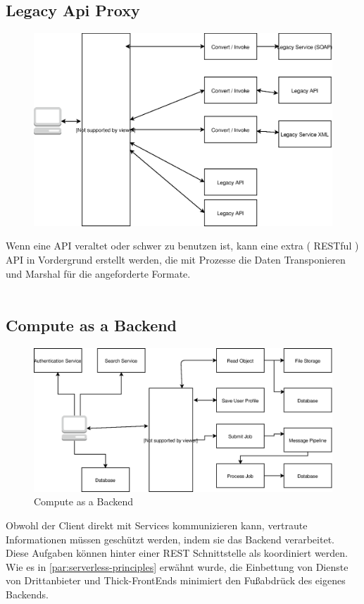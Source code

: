 \documentclass[
12pt,
english,
ngerman,
headsepline,
twoside,
openright,
numbers=noenddot,version=first
]{scrreprt}
\begin{document}
\subsection{Legacy Api Proxy}
\begin{figure}
	\includegraphics[width=0.9\linewidth]{./pics/legacy-api-proxy.eps}
\end{figure}
Wenn eine \acrshort{API} veraltet oder schwer zu benutzen ist, kann eine extra ( RESTful ) \acrshort{API} in Vordergrund erstellt werden, die  mit Prozesse die Daten Transponieren und Marshal für die angeforderte Formate.
\\
\\


\subsection{Compute as a Backend}
\begin{figure}
	\includegraphics[scale=0.36]{./pics/compute-as-a-backend.eps}
	\caption{Compute as a Backend}
	\label{pic:compute-backend}
\end{figure}
Obwohl der Client direkt mit Services kommunizieren kann, vertraute Informationen müssen geschützt werden, indem sie das Backend verarbeitet\cite{serverlessArchAWS}. Diese Aufgaben können hinter einer \acrshort{REST} Schnittstelle als koordiniert werden. Wie es in \autoref{par:serverless-principles} erwähnt wurde, die Einbettung von Dienste von Drittanbieter und Thick-FrontEnds minimiert den Fußabdrück des eigenes Backends.
\end{document}
